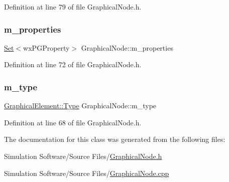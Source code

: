 Definition at line 79 of file Graphical\+Node.\+h.

\mbox{\label{class_graphical_node_a7f45ea17bdca2d822ef4d604effcca0e}} 
\subsubsection{\texorpdfstring{m\+\_\+properties}{m\_properties}}
{\footnotesize\ttfamily \hyperlink{class_set}{Set}$<$wx\+P\+G\+Property$>$ Graphical\+Node\+::m\+\_\+properties\hspace{0.3cm}{\ttfamily [protected]}}



Definition at line 72 of file Graphical\+Node.\+h.

\mbox{\label{class_graphical_node_a1e660124c138a5394dc347cb3b523f9f}} 
\subsubsection{\texorpdfstring{m\+\_\+type}{m\_type}}
{\footnotesize\ttfamily \hyperlink{class_graphical_element_aa485be48b901d85de97b3bd86f381d9e}{Graphical\+Element\+::\+Type} Graphical\+Node\+::m\+\_\+type\hspace{0.3cm}{\ttfamily [protected]}}



Definition at line 68 of file Graphical\+Node.\+h.



The documentation for this class was generated from the following files\+:\begin{DoxyCompactItemize}
\item 
Simulation Software/\+Source Files/\hyperlink{_graphical_node_8h}{Graphical\+Node.\+h}\item 
Simulation Software/\+Source Files/\hyperlink{_graphical_node_8cpp}{Graphical\+Node.\+cpp}\end{DoxyCompactItemize}
